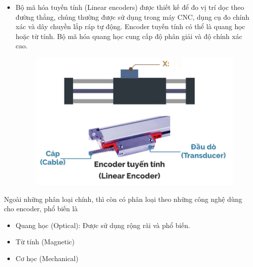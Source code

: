 \begin{itemize}
\begin{figure}[H]
            \end{figure}
            \item Bộ mã hóa tuyến tính (Linear encoders) được thiết kế để đo vị trí dọc theo đường thẳng, chúng thường được sử dụng trong máy CNC, dụng cụ đo chính xác và dây chuyền lắp ráp tự động. Encoder tuyến tính có thể là quang học hoặc từ tính. Bộ mã hóa quang học cung cấp độ phân giải và độ chính xác cao.
            \begin{figure}[H]
                \centering
                \includegraphics[width=0.7\linewidth]{pictures/encoder3.png}
            \end{figure}
        \end{itemize}
        Ngoài những phân loại chính, thì còn có phân loại theo những công nghệ dùng cho encoder, phổ biến là
        \begin{itemize}
            \item Quang học (Optical): Được sử dụng rộng rãi và phổ biến.
            \item Từ tính (Magnetic)
            \item Cơ học (Mechanical)
        \end{itemize}   
